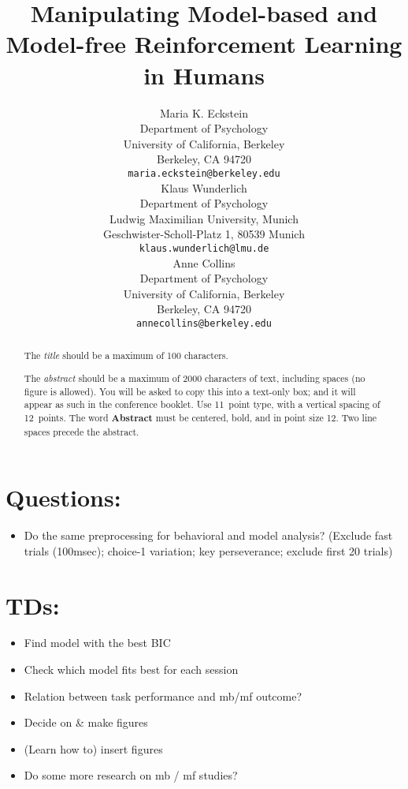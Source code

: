 \documentclass[11pt]{article} %
\title{Manipulating Model-based and Model-free Reinforcement Learning in Humans}
\author{
Maria K. Eckstein \\
Department of Psychology \\
University of California, Berkeley \\
Berkeley, CA 94720 \\
\texttt{maria.eckstein@berkeley.edu} \\
\And
Klaus Wunderlich \\
Department of Psychology \\
Ludwig Maximilian University, Munich \\
Geschwister-Scholl-Platz 1, 80539 Munich \\
\texttt{klaus.wunderlich@lmu.de} \\
\And
Anne Collins \\
Department of Psychology\\
University of California, Berkeley \\
Berkeley, CA 94720  \\
\texttt{annecollins@berkeley.edu} \\
}
\begin{document}
\maketitle

\begin{abstract}
The \emph{title} should be a maximum of 100 characters. 

The \emph{abstract} should be a maximum of 2000 characters of text,
including spaces (no figure is allowed). You will be asked to copy
this into a text-only box; and it will appear as such in the
conference booklet. Use 11~point type, with a vertical spacing of
12~points.  The word \textbf{Abstract} must be centered, bold, and in
point size 12. Two line spaces precede the abstract.
\end{abstract}




\startmain %

\section{Questions:}
\begin{itemize}
	\item Do the same preprocessing for behavioral and model analysis? (Exclude fast trials (100msec); choice-1 variation; key perseverance; exclude first 20 trials)
\end{itemize}

\section{TDs:}
\begin{itemize}
	\item Find model with the best BIC
	\item Check which model fits best for each session
	\item Relation between task performance and mb/mf outcome?
	\item Decide on \& make figures
	\item (Learn how to) insert figures
	\item Do some more research on mb / mf studies?
\end{itemize}
\end{document}
